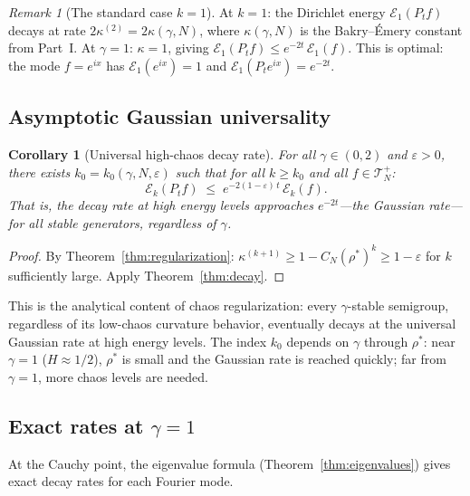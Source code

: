 \documentclass[11pt,a4paper]{article}
\theoremstyle{plain}
\newtheorem{corollary}[theorem]{Corollary}
\theoremstyle{definition}
\theoremstyle{remark}
\newtheorem{remark}[theorem]{Remark}
\begin{document}
\begin{remark}[The standard case $k = 1$]
\label{rem:standard}
At $k = 1$: the Dirichlet energy $\mathcal{E}_1(P_t f)$
decays at rate $2\kappa^{(2)} = 2\kappa(\gamma,N)$, where
$\kappa(\gamma,N)$ is the Bakry--\'Emery constant from
Part~I.  At $\gamma = 1$: $\kappa = 1$, giving
$\mathcal{E}_1(P_t f) \leq e^{-2t}\,\mathcal{E}_1(f)$.
This is optimal: the mode $f = e^{ix}$ has
$\mathcal{E}_1(e^{ix}) = 1$ and
$\mathcal{E}_1(P_t e^{ix}) = e^{-2t}$.
\end{remark}


\subsection{Asymptotic Gaussian universality}

\begin{corollary}[Universal high-chaos decay rate]
\label{cor:universality}
For all $\gamma \in (0,2)$ and $\varepsilon > 0$,
there exists $k_0 = k_0(\gamma, N, \varepsilon)$ such that
for all $k \geq k_0$ and all $f \in \mathcal{T}_N^+$:
\begin{equation}\label{eq:universality}
  \mathcal{E}_k(P_t f)
  \;\leq\; e^{-2(1-\varepsilon)\,t}\,\mathcal{E}_k(f).
\end{equation}
That is, the decay rate at high energy levels
approaches $e^{-2t}$---the Gaussian rate---for all
stable generators, regardless of $\gamma$.
\end{corollary}

\begin{proof}
By Theorem~\ref{thm:regularization}:
$\kappa^{(k+1)} \geq 1 - C_N(\rho^*)^k \geq 1-\varepsilon$
for $k$ sufficiently large.
Apply Theorem~\ref{thm:decay}.
\end{proof}

This is the analytical content of chaos regularization:
every $\gamma$-stable semigroup, regardless of its
low-chaos curvature behavior, eventually decays at the
universal Gaussian rate at high energy levels.
The index $k_0$ depends on $\gamma$ through $\rho^*$:
near $\gamma = 1$ ($H \approx 1/2$), $\rho^*$ is
small and the Gaussian rate is reached quickly;
far from $\gamma = 1$, more chaos levels are needed.


\subsection{Exact rates at $\gamma = 1$}

At the Cauchy point, the eigenvalue formula
(Theorem~\ref{thm:eigenvalues}) gives exact decay
rates for each Fourier mode.
\end{document}
